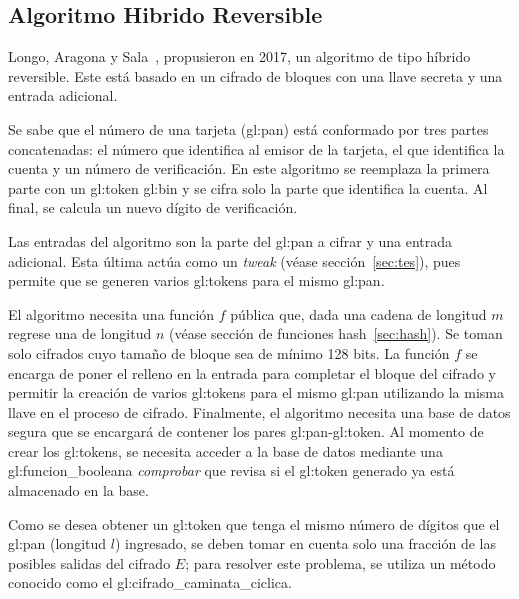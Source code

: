 %
%

\subsection{Algoritmo Hibrido Reversible}
\label{sec:ahr}
Longo, Aragona y Sala~\cite{aragona}, propusieron en 2017, un algoritmo de
tipo híbrido reversible. Este está basado en un cifrado de bloques con una
llave secreta y una entrada adicional.

Se sabe que el número de una tarjeta (\gls{gl:pan}) está conformado por tres
partes concatenadas: el número que identifica al emisor de la tarjeta, el que
identifica la cuenta y un número de verificación. En este algoritmo se reemplaza
la primera parte con un \gls{gl:token} \gls{gl:bin} y se cifra solo la parte
que identifica la cuenta. Al final, se calcula un nuevo dígito de verificación.

Las entradas del algoritmo son la parte del \gls{gl:pan} a cifrar y una entrada
adicional. Esta última actúa como un \textit{tweak} (véase
sección~\ref{sec:tes}), pues permite que se generen varios \glspl{gl:token}
para el mismo \gls{gl:pan}.

El algoritmo necesita una función $f$ pública que, dada una cadena
de longitud $m$ regrese una de longitud $n$ (véase sección de funciones
hash~\ref{sec:hash}). Se toman solo cifrados cuyo tamaño de bloque sea de
mínimo 128 bits. La función $f$ se encarga de poner el relleno en la entrada
para completar el bloque del cifrado y permitir la creación de varios
\glspl{gl:token} para el mismo \gls{gl:pan} utilizando la misma llave en el
proceso de cifrado. Finalmente, el algoritmo necesita una base de datos segura
que se encargará de contener los pares \gls{gl:pan}-\gls{gl:token}. Al momento
de crear los \glspl{gl:token}, se necesita acceder a la base de datos
mediante una \gls{gl:funcion_booleana} \textit{comprobar} que revisa si el
\gls{gl:token} generado ya está almacenado en la base.

Como se desea obtener un \gls{gl:token} que tenga el mismo número de dígitos
que el \gls{gl:pan} (longitud $l$) ingresado, se deben tomar en cuenta solo una
fracción de las posibles salidas del cifrado $E$; para resolver este problema,
se utiliza un método conocido como el \gls{gl:cifrado_caminata_ciclica}.

